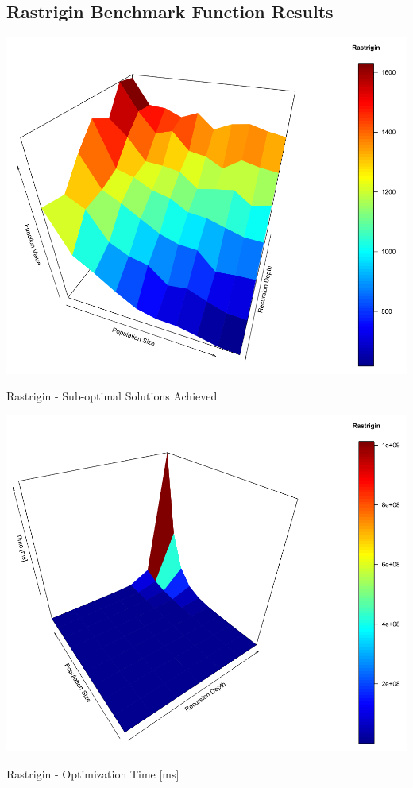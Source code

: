 \documentclass[a0,portrait,25pt]{sciposter}
\begin{document}
\begin{multicols}{3}
\begin{mdframed}[backgroundcolor=white,roundcorner=4pt,shadow=true,linewidth=1pt] \color{Black}

\section*{Rastrigin Benchmark Function Results}

\begin{minipage}[c]{1\linewidth}
\includegraphics[width=0.9\linewidth]{fig03}
\caption{Rastrigin - Sub-optimal Solutions Achieved}
\end{minipage}

\begin{minipage}[c]{1\linewidth}
\includegraphics[width=0.9\linewidth]{fig04}
\caption{Rastrigin - Optimization Time [ms]}
\end{minipage}


\end{mdframed}
\end{multicols}
\end{document}
